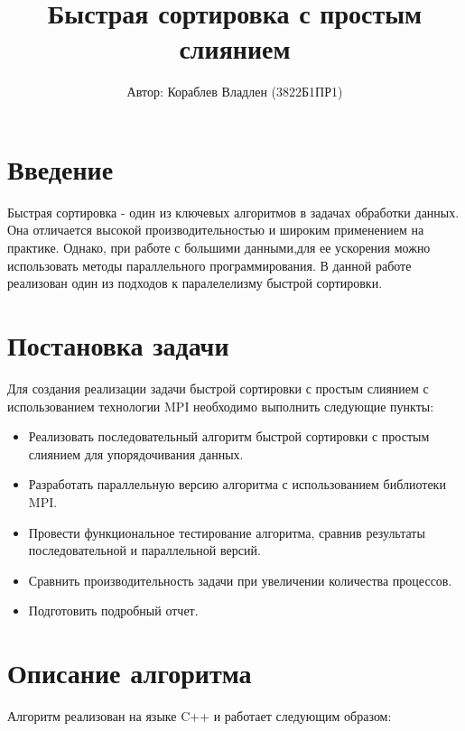 \documentclass[12pt]{article}
\title{Быстрая сортировка с простым слиянием}
\author{Автор: Кораблев Владлен (3822Б1ПР1) }
\begin{document}
\sloppy

\maketitle

\tableofcontents
\newpage

\section*{Введение}

Быстрая сортировка - один из ключевых алгоритмов в задачах обработки данных. Она отличается высокой производительностью и широким применением на практике. 
Однако, при работе с большими данными,для ее ускорения можно использовать методы параллельного программирования. В данной работе реализован один из подходов к паралелелизму
быстрой сортировки.  

\section*{Постановка задачи}
Для создания реализации задачи быстрой сортировки с простым слиянием с использованием технологии MPI необходимо выполнить следующие пункты:
\begin{itemize}
    \item Реализовать последовательный алгоритм быстрой сортировки с простым слиянием для упорядочивания данных.
    \item Разработать параллельную версию алгоритма с использованием библиотеки MPI.
    \item Провести функциональное тестирование алгоритма, сравнив результаты последовательной и параллельной версий.
    \item Сравнить производительность задачи при увеличении количества процессов.
    \item Подготовить подробный отчет.
\end{itemize}

\section*{Описание алгоритма}
Алгоритм реализован на языке C++ и работает следующим образом:
\end{document}
